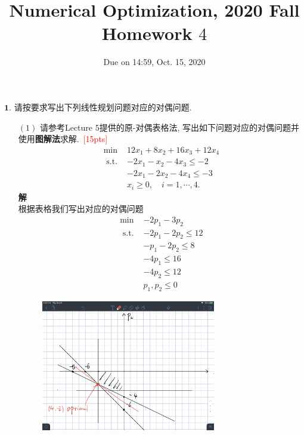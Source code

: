 \documentclass[10pt]{article}
\begin{document}
	
\title{	Numerical Optimization, 2020 Fall\\Homework $4$}
\date{Due on 14:59, Oct. 15, 2020\\}
\maketitle


$\bm{1}.$ 请按要求写出下列线性规划问题对应的对偶问题.
\begin{itemize}
	\item[$(1)$] 请参考Lecture $5$提供的原-对偶表格法, 写出如下问题对应的对偶问题并使用\textbf{图解法}求解.~\textcolor{red}{[15pts]}
	\begin{equation}
		\begin{array}{ll}
			\min & 12 x_{1}+8 x_{2}+16 x_{3}+12 x_{4} \\
			\text { s.t. } & -2 x_{1}-x_{2}-4 x_{3} \leq -2 \\
			& -2 x_{1}-2 x_{2}-4 x_{4} \leq -3 \\
			& x_{i} \geq 0, \quad i=1, \cdots, 4.
		\end{array}
	\end{equation}
	\textbf{解}\\
	根据表格我们写出对应的对偶问题
	\begin{equation}
		\begin{array}{ll}
			\min & -2p_1-3p_2 \\
			\text { s.t. } & -2p_1-2p_2\le 12 \\
			& -p_1-2p_2\le 8 \\
			& -4p_1\le 16 \\
			& -4p_2\le 12 \\
			& p_1,p_2\le 0
		\end{array}
	\end{equation}
	\begin{figure}[h!]
	\centering
	\includegraphics[width=3in]{fig2.jpeg}

\end{figure}
\end{itemize}
\end{document}
